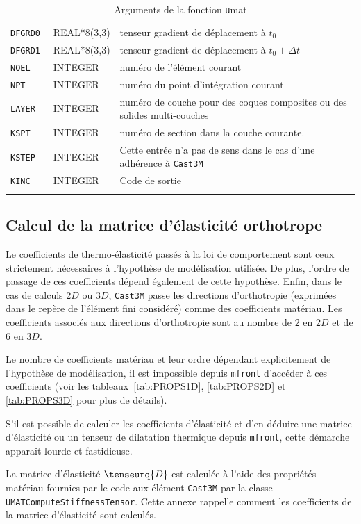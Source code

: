 \documentclass[rectoverso,pleiades,pstricks,leqno,anti]{texmf/note_technique_2010}
\newcommand{\mfront}{\texttt{mfront}}
\newcommand{\castem}{\texttt{Cast3M}}
\begin{document}
\begin{longtable}[htpb]{|p{}|p{}|p{9cm}|}
  {\tt DFGRD0 } & REAL*8(3,3) & tenseur gradient de déplacement à
  $t_{0}$ \\
  {\tt DFGRD1 } & REAL*8(3,3) & tenseur gradient de déplacement à
  $t_{0}+\Delta t$ \\
  {\tt NOEL } & INTEGER & numéro de l'élément courant \\
  {\tt NPT } & INTEGER & numéro du point d'intégration courant \\
  {\tt LAYER } & INTEGER & numéro de couche pour des coques composites
  ou des solides multi-couches \\
  {\tt KSPT } & INTEGER & numéro de section dans la couche courante. \\
  {\tt KSTEP } & INTEGER & Cette entrée n'a pas de sens dans le cas
  d'une adhérence à \castem{} \\
  {\tt KINC } & INTEGER & Code de sortie \\
  \hline
  \caption{Arguments de la fonction {\texttt umat}}
  \label{tab:umat:argument}
\end{longtable}

\subsection{Calcul de la matrice d'élasticité orthotrope}
\label{sec:calcul-de-la}

Le coefficients de thermo-élasticité passés à la loi de comportement
sont ceux strictement nécessaires à l'hypothèse de modélisation
utilisée. De plus, l'ordre de passage de ces coefficients dépend
également de cette hypothèse. Enfin, dans le cas de calculs \(2D\) ou
\(3D\), \castem{} passe les directions d'orthotropie (exprimées dans le
repère de l'élément fini considéré) comme des coefficients matériau. Les
coefficients associés aux directions d'orthotropie sont au nombre de
\(2\) en \(2D\) et de \(6\) en \(3D\).

Le nombre de coefficients matériau et leur ordre dépendant
explicitement de l'hypothèse de modélisation, il est impossible depuis
\mfront{} d'accéder à ces coefficients (voir les
tableaux~\ref{tab:PROPS1D}, \ref{tab:PROPS2D} et \ref{tab:PROPS3D}
pour plus de détails).

S'il est possible de calculer les coefficients d'élasticité et d'en
déduire une matrice d'élasticité ou un tenseur de dilatation thermique
depuis \mfront{}, cette démarche apparaît lourde et fastidieuse.

La matrice d'élasticité \(\tenseurq{D}\) est calculée à l'aide des
propriétés matériau fournies par le code aux élément \castem{} par la
classe {\tt UMAT\-Compute\-Stiff\-ness\-Tensor}. Cette annexe rappelle
comment les coefficients de la matrice d'élasticité sont calculés.
\end{document}
